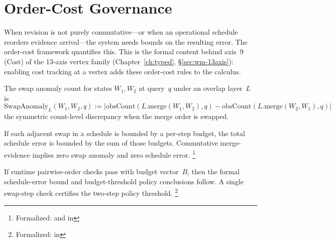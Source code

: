 \documentclass[11pt,openany]{report}
\begin{document}


\section{Order-Cost Governance}
\label{sec:order-cost}

When revision is not purely commutative---or when an operational
schedule reorders evidence arrival---the system needs bounds on the
resulting error.  The order-cost framework quantifies this.  This is
the formal content behind axis~9 (Cost) of the 13-axis vertex family
(Chapter~\ref{ch:typed}, \S\ref{sec:wm-13axis}): enabling cost
tracking at a vertex adds these order-cost rules to the calculus.

\begin{definition}
The swap anomaly count for states $W_1, W_2$ at query~$q$ under
an overlap layer~$L$ is
\[
  \mathrm{SwapAnomaly}_L(W_1, W_2, q) :=
  |\mathrm{obsCount}(L.\mathrm{merge}(W_1, W_2), q) -
   \mathrm{obsCount}(L.\mathrm{merge}(W_2, W_1), q)|
\]
the symmetric count-level discrepancy when the merge order is
swapped.
\end{definition}

\begin{theorem}
\label{thm:order-cost}
If each adjacent swap in a schedule is bounded by a per-step budget,
the total schedule error is bounded by the sum of those budgets.
Commutative merge-evidence implies zero swap anomaly and zero
schedule error.%
\footnote{Formalized:
 and
in 
}
\end{theorem}

\begin{theorem}
\label{thm:audit-cert}
If runtime pairwise-order checks pass with budget vector~$B$, then
the formal schedule-error bound and budget-threshold policy
conclusions follow.  A single swap-step check certifies the
two-step policy threshold.%
\footnote{Formalized:
in 
}
\end{theorem}
\end{document}
